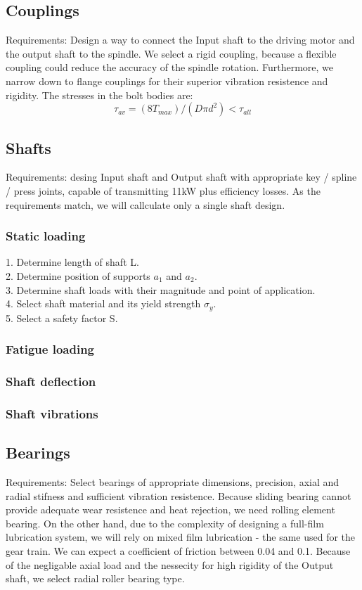 \documentclass{article}
\begin{document}
\subsection{Couplings}
Requirements: Design a way to connect the Input shaft to the driving motor and the output shaft to the spindle.
We select a rigid coupling, because a flexible coupling could reduce the accuracy of the spindle rotation.
Furthermore, we narrow down to flange couplings for their superior vibration resistence and rigidity.
The stresses in the bolt bodies are:
$$\tau_{av} = (8 T_{max}) / (D \pi d^2) < \tau_{all}$$  %

\subsection{Shafts}
Requirements: desing Input shaft and Output shaft with appropriate key / spline / press  joints, capable of transmitting 11kW plus efficiency losses.
As the requirements match, we will callculate only a single shaft design.
\subsubsection{Static loading}
1. Determine length of shaft L. \\
2. Determine position of supports $a_1$ and $a_2$. \\
3. Determine shaft loads with their magnitude and point of application. \\
4. Select shaft material and its yield strength $\sigma_y$. \\
5. Select a safety factor S. \\
\subsubsection{Fatigue loading}
\subsubsection{Shaft deflection}
\subsubsection{Shaft vibrations}
\FPeval{}
\vExample

\subsection{Bearings}
Requirements: Select bearings of appropriate dimensions, precision, axial and radial stifness and sufficient vibration resistence.
Because sliding bearing cannot provide adequate wear resistence and heat rejection, we need rolling element bearing.
On the other hand, due to the complexity of designing a full-film lubrication system, we will rely on mixed film lubrication - the same used for the gear train.
We can expect a coefficient of friction between 0.04 and 0.1.
Because of the negligable axial load and the nessecity for high rigidity of the Output shaft, we select radial roller bearing type.
\end{document}
